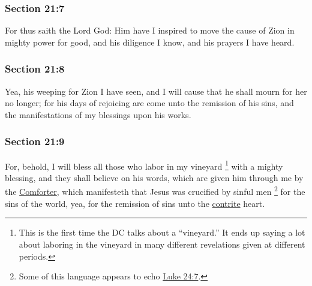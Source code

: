	\subsubsection{Section 21:7} %
		\label{DC21-7}

		For thus saith the Lord God: Him have I inspired to move the cause of Zion in mighty power for good, and his diligence I know, and his prayers I have heard.


	\subsubsection{Section 21:8} %
		\label{DC21-8}

		Yea, his weeping for Zion I have seen, and I will cause that he shall mourn for her no longer; for his days of rejoicing are come unto the remission of his sins, and the manifestations of my blessings upon his works.


	\subsubsection{Section 21:9} %
		\label{DC21-9}

		For, behold, I will bless all those who labor in my vineyard%
			\footnote{%
				This is the first time the DC talks about a ``vineyard.'' It ends up saying a lot about laboring in the vineyard in many different revelations given at different periods.
				}
		with a mighty blessing, and they shall believe on his words, which are given him through me by the \hyperref[COMFORTER]{Comforter}, which manifesteth that Jesus was crucified by sinful men%
			\footnote{%
				Some of this language appears to echo \hyperref[LUKE-24-7]{Luke 24:7}.
				}
		for the sins of the world, yea, for the remission of sins unto the \hyperref[CONTRITE]{contrite} heart.

